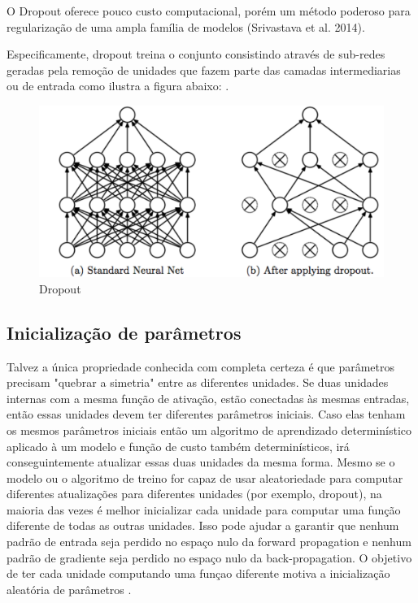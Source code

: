 \documentclass[12pt]{article}
\begin{document}
O Dropout oferece pouco custo computacional, porém um método poderoso para regularização de uma ampla família de modelos (Srivastava et al. 2014).

Especificamente, dropout treina o conjunto consistindo através de sub-redes geradas pela remoção de unidades que fazem parte das camadas intermediarias ou de entrada como ilustra a figura abaixo: \cite{Goodfellow-et-al-2016}.

\begin{figure}[ht]
\centering
\includegraphics[width=.8\textwidth]{images/dropout.png}
\caption{Dropout}
\label{fig:dropout}
\end{figure}

\subsection{Inicialização de parâmetros}

Talvez a única propriedade conhecida com completa certeza é que parâmetros precisam "quebrar a simetria" entre as diferentes unidades. Se duas unidades internas com a mesma função de ativação, estão conectadas às mesmas entradas, então essas unidades devem ter diferentes parâmetros iniciais. Caso elas tenham os mesmos parâmetros iniciais então um algoritmo de aprendizado determinístico aplicado à um modelo e função de custo também determinísticos, irá conseguintemente atualizar essas duas unidades da mesma forma. Mesmo se o modelo ou o algoritmo de treino for capaz de usar aleatoriedade para computar diferentes atualizações para diferentes unidades (por exemplo, dropout), na maioria das vezes é melhor inicializar cada unidade para computar uma função diferente de todas as outras unidades. Isso pode ajudar a garantir que nenhum padrão de entrada seja perdido no espaço nulo da forward propagation e nenhum padrão de gradiente seja perdido no espaço nulo da back-propagation. O objetivo de ter cada unidade computando uma funçao diferente motiva a inicialização aleatória de parâmetros \cite{Goodfellow-et-al-2016}.
\end{document}
